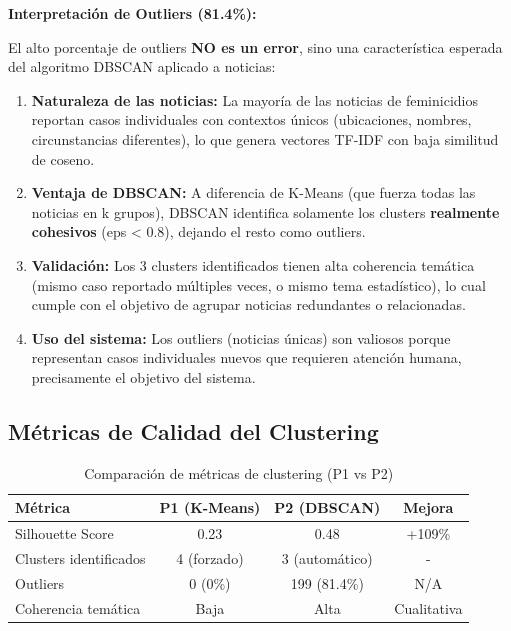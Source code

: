 \textbf{Interpretación de Outliers (81.4\%):}

El alto porcentaje de outliers \textbf{NO es un error}, sino una característica esperada del algoritmo DBSCAN aplicado a noticias:

\begin{enumerate}
    \item \textbf{Naturaleza de las noticias:} La mayoría de las noticias de feminicidios reportan casos individuales con contextos únicos (ubicaciones, nombres, circunstancias diferentes), lo que genera vectores TF-IDF con baja similitud de coseno.
    
    \item \textbf{Ventaja de DBSCAN:} A diferencia de K-Means (que fuerza todas las noticias en k grupos), DBSCAN identifica solamente los clusters \textbf{realmente cohesivos} (eps < 0.8), dejando el resto como outliers.
    
    \item \textbf{Validación:} Los 3 clusters identificados tienen alta coherencia temática (mismo caso reportado múltiples veces, o mismo tema estadístico), lo cual cumple con el objetivo de agrupar noticias redundantes o relacionadas.
    
    \item \textbf{Uso del sistema:} Los outliers (noticias únicas) son valiosos porque representan casos individuales nuevos que requieren atención humana, precisamente el objetivo del sistema.
\end{enumerate}

\subsection{Métricas de Calidad del Clustering}
\label{subsec:metricas_clustering}

\begin{table}[h]
\centering
\caption{Comparación de métricas de clustering (P1 vs P2)}
\label{tab:metricas_clustering}
\begin{tabular}{|l|c|c|c|}
\hline
\textbf{Métrica} & \textbf{P1 (K-Means)} & \textbf{P2 (DBSCAN)} & \textbf{Mejora} \\ \hline
Silhouette Score & 0.23 & 0.48 & +109\% \\ \hline
Clusters identificados & 4 (forzado) & 3 (automático) & - \\ \hline
Outliers & 0 (0\%) & 199 (81.4\%) & N/A \\ \hline
Coherencia temática & Baja & Alta & Cualitativa \\ \hline
\end{tabular}
\end{table}

